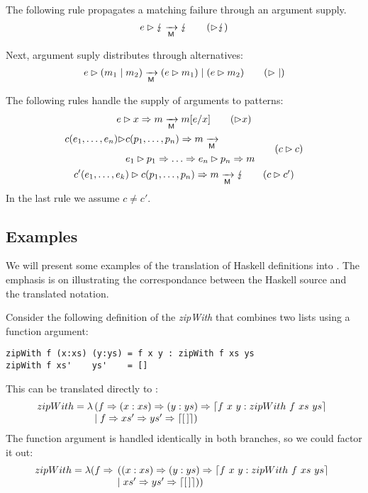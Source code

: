 The following rule propagates a matching failure through an argument supply.
\begin{equation}
  \matcharg{e}{\matchfail} \matred \matchfail \tag{$\amatcharg\matchfail$}
\end{equation}

Next, argument suply distributes through alternatives:
\begin{equation}
  \matcharg{e}{(\matchalt{m_1}{m_2})} \matred
  \matchalt{(\matcharg{e}{m_1})}{(\matcharg{e}{m_2})} \tag{$\amatcharg\amatchalt$}
\end{equation}

The following rules handle the supply of arguments to patterns:
\begin{gather}
  \matcharg{e}{\matchpat{x}{m}} \matred m[e/x] \tag{$\amatcharg x$}\\
  \begin{split}
      \matcharg{\constr{c}{e_1,\ldots,e_n}}{&\matchpat{\constr{c}{p_1,\ldots,p_n}}{m}}
      \matred \\
      &e_1 \amatcharg p_1 \amatchpat \ldots \amatchpat e_n \amatcharg p_n \amatchpat m
    \end{split} \tag{$c\amatcharg c$}
  \\
  \matcharg{\constr{c'}{e_1,\ldots,e_k}}{\matchpat{\constr{c}{p_1,\ldots,p_n}}{m}}
  \matred
  \matchfail \tag{$c\amatcharg c'$} 
\end{gather}
In the last rule we assume $c\neq c'$.


\subsection{Examples}\label{sec:examples}

We will present some examples of the translation of Haskell definitions
into \lambdaPMC.  The emphasis is on illustrating the correspondance
between the Haskell source and the translated notation.

Consider the following definition of the
\emph{zipWith} that combines two lists using a function argument:
%
\begin{verbatim}
zipWith f (x:xs) (y:ys) = f x y : zipWith f xs ys
zipWith f xs'    ys'    = []
\end{verbatim}
%
This can be translated directly to \lambdaPMC:
%
\[
  zipWith = \lambda 
  \!\!\begin{array}[t]{l}
    (f \Rightarrow (x:xs) \Rightarrow (y:ys) \Rightarrow \left\lceil f~x~y : zipWith~ f~ xs~ ys\right\rceil  \\
    \mid f \Rightarrow xs' \Rightarrow ys' \Rightarrow \left\lceil [\,]\right\rceil)
  \end{array}
\]
%
The function argument is handled identically in both branches, so we
could factor it out:
 \[
   zipWith = \lambda (f \Rightarrow 
   \!\!\begin{array}[t]{l}
     ((x:xs) \Rightarrow (y:ys) \Rightarrow \left\lceil f~ x~ y : zipWith~f~xs~ys\right\rceil  \\
     \mid  xs' \Rightarrow ys' \Rightarrow \left\lceil [\,]\right\rceil))
   \end{array}
 \]


